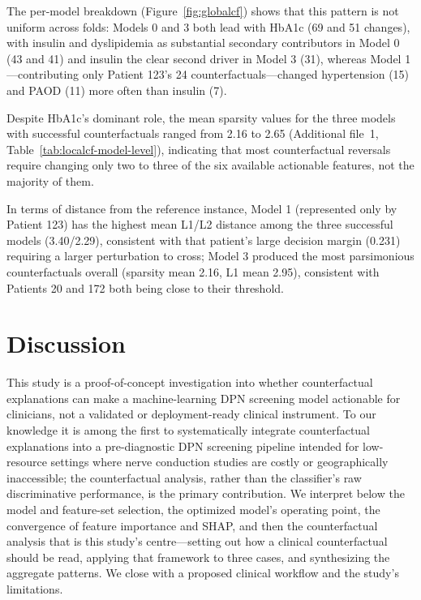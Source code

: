 \documentclass[pdflatex,sn-mathphys-num]{sn-jnl}%
\theoremstyle{thmstyleone}%
\theoremstyle{thmstyletwo}%
\theoremstyle{thmstylethree}%
\begin{document}
The per-model breakdown (Figure~\ref{fig:globalcf}) shows that this pattern is not uniform across folds: Models 0 and 3 both lead with HbA1c (69 and 51 changes), with insulin and dyslipidemia as substantial secondary contributors in Model 0 (43 and 41) and insulin the clear second driver in Model 3 (31), whereas Model 1---contributing only Patient 123's 24 counterfactuals---changed hypertension (15) and PAOD (11) more often than insulin (7).

Despite HbA1c's dominant role, the mean sparsity values for the three models with successful counterfactuals ranged from 2.16 to 2.65 (Additional file~1, Table~\ref{tab:localcf-model-level}), indicating that most counterfactual reversals require changing only two to three of the six available actionable features, not the majority of them.

In terms of distance from the reference instance, Model 1 (represented only by Patient 123) has the highest mean L1/L2 distance among the three successful models (3.40/2.29), consistent with that patient's large decision margin (0.231) requiring a larger perturbation to cross; Model 3 produced the most parsimonious counterfactuals overall (sparsity mean 2.16, L1 mean 2.95), consistent with Patients 20 and 172 both being close to their threshold.


\section{Discussion}\label{discussion}

This study is a proof-of-concept investigation into whether counterfactual explanations can make a
machine-learning DPN screening model actionable for clinicians, not a validated or deployment-ready
clinical instrument. To our knowledge it is among the first to systematically integrate
counterfactual explanations into a pre-diagnostic DPN screening pipeline intended for low-resource
settings where nerve conduction studies are costly or geographically inaccessible; the counterfactual
analysis, rather than the classifier's raw discriminative performance, is the primary contribution.
We interpret below the model and feature-set selection, the optimized model's operating point, the
convergence of feature importance and SHAP, and then the counterfactual analysis that is this
study's centre---setting out how a clinical counterfactual should be read, applying that framework to
three cases, and synthesizing the aggregate patterns. We close with a proposed clinical workflow and
the study's limitations.
\end{document}
